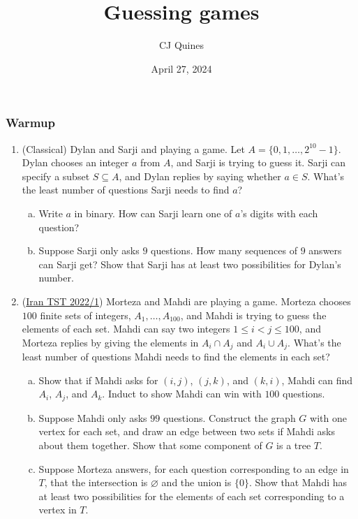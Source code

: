 \documentclass[11pt,paper=letter]{scrartcl}
\begin{document}
\title{Guessing games}
\author{CJ Quines}
\date{April 27, 2024}

\maketitle

\subsubsection*{Warmup}

\begin{enumerate}
\item (Classical) Dylan and Sarji and playing a game. Let $A = \{0, 1, \ldots, 2^{10} - 1\}$. Dylan chooses an integer $a$ from $A$, and Sarji is trying to guess it. Sarji can specify a subset $S \subseteq A$, and Dylan replies by saying whether $a \in S$. What's the least number of questions Sarji needs to find $a$?
\begin{enumerate}[(a)]
\item Write $a$ in binary. How can Sarji learn one of $a$'s digits with each question?
\item Suppose Sarji only asks $9$ questions. How many sequences of $9$ answers can Sarji get? Show that Sarji has at least two possibilities for Dylan's number.
\end{enumerate}

\item (\href{https://artofproblemsolving.com/community/c6h2815100p24855547}{Iran TST 2022/1}) Morteza and Mahdi are playing a game. Morteza chooses $100$ finite sets of integers, $A_1, \ldots, A_{100}$, and Mahdi is trying to guess the elements of each set. Mahdi can say two integers $1 \le i < j \le 100$, and Morteza replies by giving the elements in $A_i \cap A_j$ and $A_i \cup A_j$. What's the least number of questions Mahdi needs to find the elements in each set?

\begin{enumerate}[(a)]
\item Show that if Mahdi asks for $(i, j)$, $(j, k)$, and $(k, i)$, Mahdi can find $A_i$, $A_j$, and $A_k$. Induct to show Mahdi can win with $100$ questions.
\item Suppose Mahdi only asks $99$ questions. Construct the graph $G$ with one vertex for each set, and draw an edge between two sets if Mahdi asks about them together. Show that some component of $G$ is a tree $T$.
\item Suppose Morteza answers, for each question corresponding to an edge in $T$, that the intersection is $\varnothing$ and the union is $\{0\}$. Show that Mahdi has at least two possibilities for the elements of each set corresponding to a vertex in $T$.
\end{enumerate}

\end{enumerate}
\end{document}
